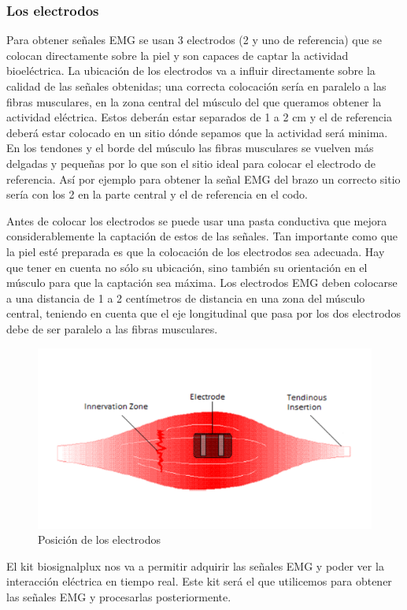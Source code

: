\subsubsection{Los electrodos}

Para obtener señales EMG se usan 3 electrodos (2 y uno de referencia) que se colocan directamente sobre la piel y son capaces de captar la actividad bioeléctrica. La ubicación de los electrodos va a influir directamente sobre la calidad de las señales obtenidas; una correcta colocación sería en paralelo a las fibras musculares, en la zona central del músculo del que queramos obtener la actividad eléctrica. Estos deberán estar separados de 1 a 2 cm y el de referencia deberá estar colocado en un sitio dónde sepamos que la actividad será minima. En los tendones y el borde del músculo las fibras musculares se vuelven más delgadas y pequeñas por lo que son el sitio ideal para colocar el electrodo de referencia. Así por ejemplo para obtener la señal EMG del brazo un correcto sitio sería con los 2 en la parte central y el de referencia en el codo.\newline 

Antes de colocar los electrodos se puede usar una pasta conductiva que mejora considerablemente la captación de estos de las señales.
Tan importante como que la piel esté preparada es que la colocación de los electrodos sea adecuada. Hay que tener en cuenta no sólo su ubicación, sino también su orientación en el músculo para que la captación sea máxima.  Los electrodos EMG deben colocarse a una distancia de 1 a 2 centímetros de distancia en una zona del músculo central, teniendo en cuenta que el eje longitudinal que pasa por los dos electrodos debe de ser paralelo a las fibras musculares.\newline

\begin{figure}[H]
	\center
	\includegraphics[scale=0.8]{imagenes/EstadodelArte/electrodo.png}
	\caption{Posición de los electrodos}
	\label{fig:Posici}
\end{figure}
 

El kit biosignalplux nos va a permitir adquirir las señales EMG y poder ver la interacción eléctrica en tiempo real. Este kit será el que utilicemos para obtener las señales EMG y procesarlas posteriormente.




